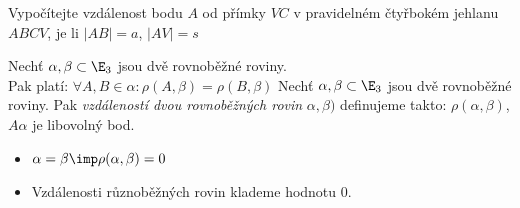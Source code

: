 \Pr Vypočítejte vzdálenost bodu $A$ od přímky $VC$ v pravidelném čtyřbokém jehlanu $ABCV$, je li $|AB|=a$, $|AV|=s$


\V Nechť $\alpha,\beta \subset \E_3$ jsou dvě rovnoběžné roviny.\\
Pak platí: $\forall A,B \in \alpha: \rho(A,\beta) = \rho(B,\beta)$
\Def Nechť $\alpha,\beta \subset \E_3$ jsou dvě rovnoběžné roviny.
Pak \emph{vzdáleností dvou rovnoběžných rovin} $\alpha,\beta)$ definujeme takto: $\rho(\alpha,\beta)$, $A\alpha$ je libovolný bod.
\Poz
\begin{itemize}
	\item $\alpha = \beta \imp \rho(\alpha,\beta) = 0 $
	\item Vzdálenosti různoběžných rovin klademe hodnotu 0.
\end{itemize}
\EndDoc



